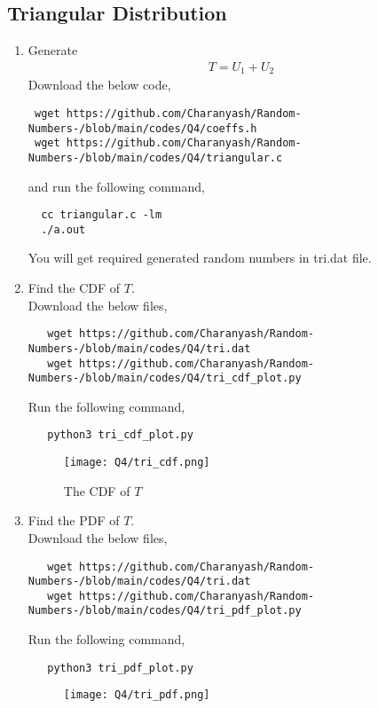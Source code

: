 \documentclass[journal,12pt,twocolumn]{IEEEtran}
\begin{document}
\begin{enumerate}[label=\thesection.\arabic*
,ref=\thesection.\theenumi]
 \section{Triangular Distribution}
\begin{enumerate}[label=\thesection.\arabic*
,ref=\thesection.\theenumi]
%
\item Generate
	\begin{align}
		T = U_1+U_2
	\end{align}
\solution Download the below code,
 \begin{lstlisting}
 wget https://github.com/Charanyash/Random-Numbers-/blob/main/codes/Q4/coeffs.h
 wget https://github.com/Charanyash/Random-Numbers-/blob/main/codes/Q4/triangular.c
 \end{lstlisting}
and run the following command,
 \begin{lstlisting}
  cc triangular.c -lm
  ./a.out
 \end{lstlisting}
 You will get required generated random numbers in tri.dat file.		
\item Find the CDF of $T$.\\
 \solution Download the below files,
  \begin{lstlisting}
   wget https://github.com/Charanyash/Random-Numbers-/blob/main/codes/Q4/tri.dat
   wget https://github.com/Charanyash/Random-Numbers-/blob/main/codes/Q4/tri_cdf_plot.py
  \end{lstlisting}
  Run the following command,
  \begin{lstlisting}
   python3 tri_cdf_plot.py
  \end{lstlisting}
  \begin{figure}
   \centering
   \texttt{[image: Q4/tri\_cdf.png]}
   \caption{The CDF of $T$}
   \label{fig:tri_cdf}
  \end{figure}
\item Find the PDF of $T$.\\
 \solution Download the below files,
  \begin{lstlisting}
   wget https://github.com/Charanyash/Random-Numbers-/blob/main/codes/Q4/tri.dat
   wget https://github.com/Charanyash/Random-Numbers-/blob/main/codes/Q4/tri_pdf_plot.py
  \end{lstlisting}
  Run the following command,
  \begin{lstlisting}
   python3 tri_pdf_plot.py
  \end{lstlisting}		
 \begin{figure}
  \centering
  \texttt{[image: Q4/tri\_pdf.png]}

\end{figure}
\end{enumerate}
\end{enumerate}
\end{document}

